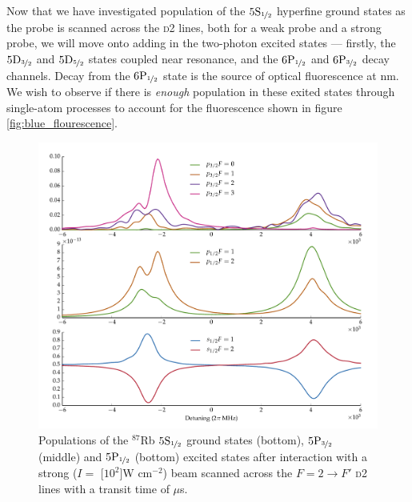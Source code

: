     Now that we have investigated population of the
    $5\rm{S}_{\nicefrac{1}{2}}$ hyperfine ground states as the probe is
    scanned across the \textsc{d2} lines, both for a weak probe and a strong
    probe, we will move onto adding in the two-photon excited states ---
    firstly, the $5\rm{D}_{\nicefrac{3}{2}}$ and $5\rm{D}_{\nicefrac{5}{2}}$
    states coupled near resonance, and the $6\rm{P}_{\nicefrac{1}{2}}$ and
    $6\rm{P}_{\nicefrac{3}{2}}$ decay channels. Decay from the
    $6\rm{P}_{\nicefrac{1}{2}}$ state is the source of optical fluorescence at
    \unit[422]{nm}. We wish to observe if there is \textit{enough} population in
    these exited states through single-atom processes to account for the
    fluorescence shown in figure \ref{fig:blue_flourescence}.

    \begin{figure}%
    \includegraphics[width=\linewidth]{figs/05_twophoton/rb87_5spd6p_hf_2_solve_scan_e02_FIXED_1e2W_fig1.pdf}
    \caption{
    Populations of the $^{87}$Rb $5\rm{S}_{\nicefrac{1}{2}}$ ground states
    (bottom), $5\rm{P}_{\nicefrac{3}{2}}$ (middle) and
    $5\rm{P}_{\nicefrac{1}{2}}$  (bottom) excited states after interaction
    with a strong ($I = $ \unit[$10^2$]{W cm$^{-2}$}) beam scanned across the $F
    = 2 \rightarrow F'$ \textsc{d2} lines with a transit time of
    \unit[2]{$\mu$s}.
    }
    \label{fig:strong_SP_state_pop} 
    \end{figure} 

